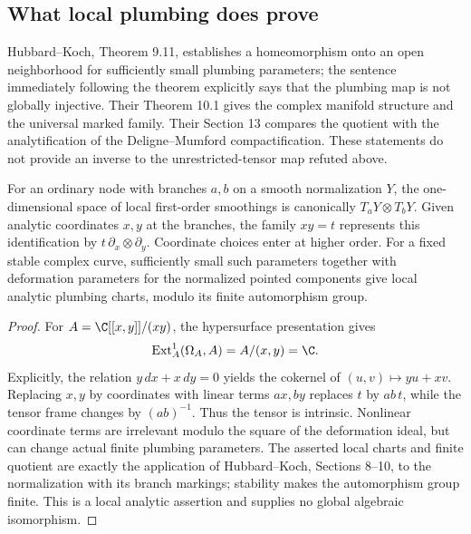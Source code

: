 \subsection{What local plumbing does prove}
Hubbard--Koch, Theorem 9.11, establishes a homeomorphism onto an open neighborhood for sufficiently small plumbing parameters; the sentence immediately following the theorem explicitly says that the plumbing map is not globally injective. Their Theorem 10.1 gives the complex manifold structure and the universal marked family. Their Section 13 compares the quotient with the analytification of the Deligne--Mumford compactification. These statements do not provide an inverse to the unrestricted-tensor map refuted above.

\begin{proposition}\label{A1-first-order}
For an ordinary node with branches $a,b$ on a smooth normalization $Y$, the one-dimensional space of local first-order smoothings is canonically $T_aY\otimes T_bY$. Given analytic coordinates $x,y$ at the branches, the family $xy=t$ represents this identification by $t\,\partial_x\otimes\partial_y$. Coordinate choices enter at higher order. For a fixed stable complex curve, sufficiently small such parameters together with deformation parameters for the normalized pointed components give local analytic plumbing charts, modulo its finite automorphism group.
\end{proposition}
\begin{proof}
For $A=\C[[x,y]]/(xy)$, the hypersurface presentation gives
\[
\operatorname{Ext}^1_A(\Omega_A,A)=A/(x,y)=\C.
\]
Explicitly, the relation $y\,dx+x\,dy=0$ yields the cokernel of $(u,v)\mapsto yu+xv$. Replacing $x,y$ by coordinates with linear terms $ax,by$ replaces $t$ by $ab\,t$, while the tensor frame changes by $(ab)^{-1}$. Thus the tensor is intrinsic. Nonlinear coordinate terms are irrelevant modulo the square of the deformation ideal, but can change actual finite plumbing parameters. The asserted local charts and finite quotient are exactly the application of Hubbard--Koch, Sections 8--10, to the normalization with its branch markings; stability makes the automorphism group finite. This is a local analytic assertion and supplies no global algebraic isomorphism.
\end{proof}

